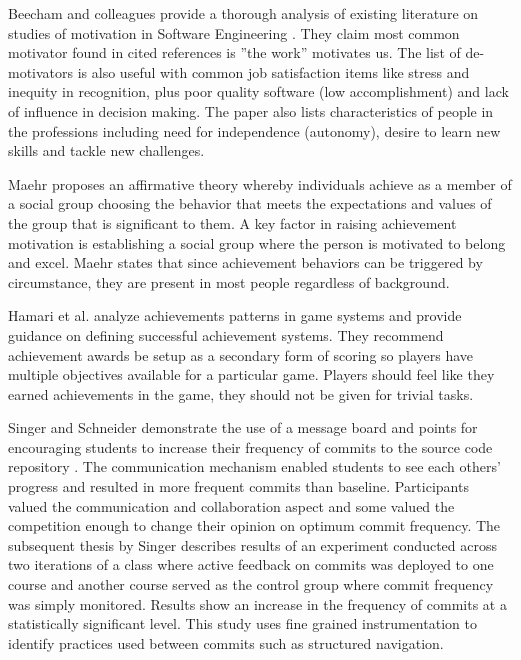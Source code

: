 \documentclass{sig-alternate}
\begin{document}
Beecham and colleagues provide a thorough analysis of existing literature on studies of motivation in Software Engineering \cite{Beecham2008Motivation}.  They claim most common motivator found in cited references is ''the work'' motivates us. The list of de-motivators is also useful with common job satisfaction items like stress and inequity in recognition, plus poor quality software (low accomplishment) and lack of influence in decision making. The paper also lists characteristics of people in the professions including need for independence (autonomy), desire to learn new skills and tackle new challenges. 

Maehr proposes an affirmative theory whereby  individuals achieve as a member of a social group choosing the behavior that meets the expectations and values of the group that is significant to them\cite{wbsnipes:MaehrCulture}.  A key factor in raising achievement motivation is establishing a social group where the person is motivated to belong and excel.  Maehr states that since achievement behaviors can be triggered by circumstance, they are present in most people regardless of background. 

Hamari et al. analyze achievements patterns in game systems and provide guidance on defining successful achievement systems.  They recommend  achievement awards be setup as a secondary form of scoring so players have multiple objectives available for a particular game.  Players should feel like they earned achievements in the game, they should not be given for trivial tasks.

Singer and Schneider demonstrate the use of a message board and points for encouraging students to increase their frequency of commits to the source code repository \cite{Singer2012It}.  The communication mechanism enabled students to see each others' progress and resulted in more frequent commits than baseline.  Participants valued the communication and collaboration aspect and some valued the competition enough to change their opinion on optimum commit frequency.  The subsequent thesis by Singer \cite{Singer2013a} describes results of an experiment conducted across two iterations of a class where active feedback on commits was deployed to one course and another course served as the control group where commit frequency was simply monitored.  Results show an increase in the frequency of commits at a statistically significant level.  This study uses fine grained instrumentation to identify practices used between commits such as structured navigation.
\end{document}
